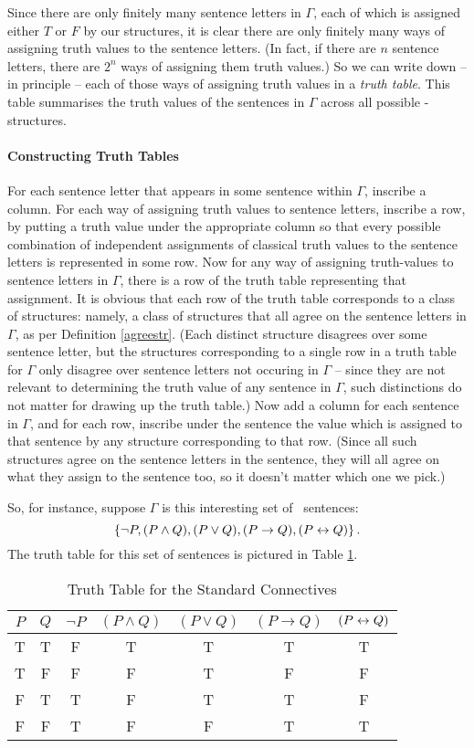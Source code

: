 Since there are only finitely many sentence letters in $\Gamma$, each of which is assigned either $T$ or $F$ by our structures, it is clear there are only finitely many ways of assigning truth values to the sentence letters. (In fact, if there are $n$ sentence letters, there are $2^n$ ways of assigning them truth values.) So we can write down – in principle – each of those ways of assigning truth values in a \emph{truth table}. This table summarises the truth values of the sentences in $\Gamma$ across all possible \lone-structures.

\paragraph{Constructing Truth Tables} For each sentence letter that appears in some sentence within $\Gamma$, inscribe a column. For each way of assigning truth values to sentence letters, inscribe a row, by putting a truth value under the appropriate column so that every possible combination of independent assignments of classical truth values to the sentence letters is represented in some row. Now for any way of assigning truth-values to sentence letters in $\Gamma$, there is a row of the truth table representing that assignment. It is obvious that each row of the truth table corresponds to a class of structures: namely, a class of structures that all agree on the sentence letters in $\Gamma$, as per Definition \ref{agreestr}. (Each distinct structure disagrees over some sentence letter, but the structures corresponding to a single row in a truth table for $\Gamma$ only disagree over sentence letters not occuring in $\Gamma$ –  since they are not relevant to determining the truth value of any sentence in $\Gamma$, such distinctions do not matter for drawing up the truth table.) Now add a column for each sentence in $\Gamma$, and for each row, inscribe under the sentence the value which is assigned to that sentence by any structure corresponding to that row. (Since all such structures agree on the sentence letters in the sentence, they will all agree on what they assign to the sentence too, so it doesn't matter which one we pick.) 

So, for instance, suppose $\Gamma$ is this interesting set of \lone\ sentences: $$\left\{\neg P, (P\wedge Q), (P\vee Q), (P \to Q), (P\leftrightarrow Q)\right\}.$$ The truth table for this set of sentences is pictured in Table \ref{tt}. 

\begin{table}[t]
	\centering
	\begin{tabular}{cc|ccccc}
\toprule
$P$ & $Q$ & $\neg P$ & $(P\wedge Q)$ & $(P\vee Q)$ & $(P \to Q)$ & $(P\leftrightarrow Q)$	\\
\midrule
T & T & F & T & T & T & T \\
T & F & F & F & T & F & F \\
F & T & T & F & T & T & F \\
F & F & T & F & F & T & T \\
\bottomrule
	\end{tabular}
	\caption{Truth Table for the Standard Connectives\label{tt}}
\end{table}


